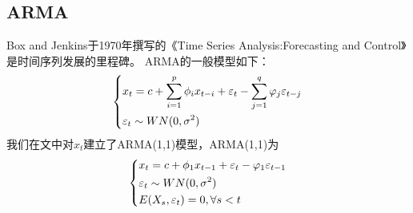     \subsection{ARMA}
        \par
        Box and Jenkins于1970年撰写的《Time Series Analysis:Forecasting and Control》是时间序列发展的里程碑。
        ARMA的一般模型如下：
        \begin{equation*}
        \centering
        \left\{\begin{lgathered}
        {x_t} = c + \sum\limits_{i = 1}^p {{\phi _i}{x_{t - i}}}  + {\varepsilon _t} - \sum\limits_{j = 1}^q {{\varphi _j}{\varepsilon _{t - j}}} \\
        {\varepsilon _t} \sim WN(0,{\sigma ^2})
        \end{lgathered} \right.
        \end{equation*}
        我们在文中对$x_t$建立了ARMA(1,1)模型，ARMA(1,1)为
        \begin{equation*}
        \centering
        \left\{\begin{lgathered}
        {x_t} = c + {\phi _1}{x_{t - 1}} + {\varepsilon _t} - {\varphi _1}{\varepsilon _{t - 1}}\\
        {\varepsilon _t} \sim WN(0,{\sigma ^2})\\
        E({X_s},{\varepsilon _t}) = 0,\forall s < t
        \end{lgathered} \right.
        \end{equation*}
